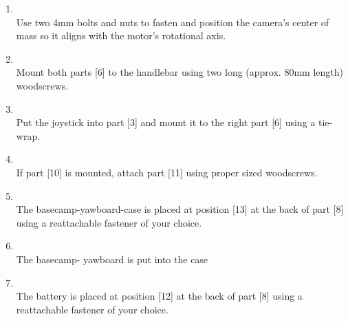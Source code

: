 \begin{enumerate}[label=\bfseries Step \arabic*]
\item \hfill \\
Use two 4mm bolts and nuts to fasten and position the camera’s center of mass so it aligns
with the motor’s rotational axis.
\item \hfill \\
Mount both parts [6] to the handlebar using two long (approx. 80mm length) woodscrews.
\item \hfill \\
Put the joystick into part [3] and mount it to the right part [6] using a tie-wrap.
\item \hfill \\
If part [10] is mounted, attach part [11] using proper sized woodscrews.
\item \hfill \\
The basecamp-yawboard-case is placed at position [13] at the back of part [8] using a
reattachable fastener of your choice.
\item \hfill \\
The basecamp- yawboard is put into the case
\item \hfill \\
The battery is placed at position [12] at the back of part [8] using a reattachable fastener of
your choice.
\end{enumerate}
